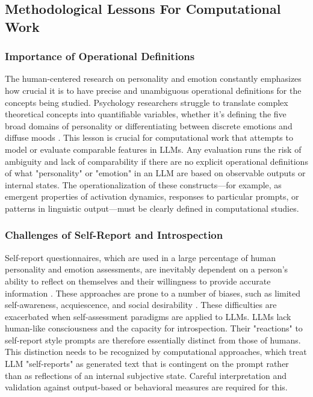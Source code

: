 \documentclass{DESSThesis}
\begin{document}
\subsection{Methodological Lessons For Computational Work}

\subsubsection{Importance of Operational Definitions}
The human-centered research on personality and emotion constantly emphasizes how crucial it is to have precise and unambiguous operational definitions for the concepts being studied. Psychology researchers struggle to translate complex theoretical concepts into quantifiable variables, whether it's defining the five broad domains of personality or differentiating between discrete emotions and diffuse moods \cite{feng_five-factor_2024,david_watson_panas-x_1994,paul_towards_2020}. This lesson is crucial for computational work that attempts to model or evaluate comparable features in LLMs. Any evaluation runs the risk of ambiguity and lack of comparability if there are no explicit operational definitions of what "personality" or "emotion" in an LLM are based on observable outputs or internal states. The operationalization of these constructs—for example, as emergent properties of activation dynamics, responses to particular prompts, or patterns in linguistic output—must be clearly defined in computational studies.

\subsubsection{Challenges of Self-Report and Introspection}
Self-report questionnaires, which are used in a large percentage of human personality and emotion assessments, are inevitably dependent on a person's ability to reflect on themselves and their willingness to provide accurate information \cite{cobb-clark_stability_2012,johnson_measuring_2014,paul_towards_2020}. These approaches are prone to a number of biases, such as limited self-awareness, acquiescence, and social desirability \cite{cobb-clark_stability_2012,johnson_measuring_2014}. These difficulties are exacerbated when self-assessment paradigms are applied to LLMs. LLMs lack human-like consciousness and the capacity for introspection. Their "reactions" to self-report style prompts are therefore essentially distinct from those of humans. This distinction needs to be recognized by computational approaches, which treat LLM "self-reports" as generated text that is contingent on the prompt rather than as reflections of an internal subjective state. Careful interpretation and validation against output-based or behavioral measures are required for this.
\end{document}
